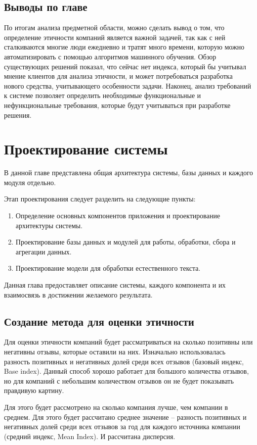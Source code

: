 \documentclass[PI, VKR]{HSEUniversity}
\begin{document}
\section{Выводы по главе}
\label{sec:org5132265}
По итогам анализа предметной области, можно сделать вывод о том, что определение этичности компаний является важной задачей, так как с ней сталкиваются многие люди ежедневно и тратят много времени, которую можно автоматизировать с помощью алгоритмов машинного обучения. Обзор существующих решений показал, что сейчас нет индекса, который бы учитывал мнение клиентов для анализа этичности, и может потребоваться разработка нового средства, учитывающего особенности задачи. Наконец, анализ требований к системе позволяет определить необходимые функциональные и нефункциональные требования, которые будут учитываться при разработке решения.
\chapter{Проектирование системы}
\label{sec:orgd718095}
В данной главе представлена общая архитектура системы, базы данных и каждого модуля отдельно.

Этап проектирования следует разделить на следующие пункты:
\begin{enumerate}
\item Определение основных компонентов приложения и проектирование архитектуры системы.
\item Проектирование базы данных и модулей для работы, обработки, сбора и агрегации данных.
\item Проектирование модели для обработки естественного текста.
\end{enumerate}

Данная глава предоставляет описание системы, каждого компонента и их взаимосвязь в достижении желаемого результата.
\section{Создание метода для оценки этичности}
\label{sec:org0e0349e}
Для оценки этичности компаний будет рассматриваться на сколько позитивны или негативны отзывы, которые оставили на них. Изначально использовалась разность позитивных и негативных долей среди всех отзывов (базовый индекс, Base index). Данный способ хорошо работает для большого количества отзывов, но для компаний с небольшим количеством отзывов он не будет показывать правдивую картину.

Для этого будет рассмотрено на сколько компания лучше, чем компании в среднем. Для этого будет рассчитано среднее значение -- разность позитивных и негативных долей среди всех отзывов за год для каждого источника компании (средний индекс, Mean Index). И рассчитана дисперсия.
\end{document}
